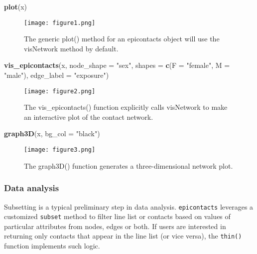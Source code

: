 \documentclass[9pt,a4paper,]{extarticle}
\newenvironment{Shaded}{\begin{snugshade}}{\end{snugshade}}
\newcommand{\KeywordTok}[1]{\textcolor[rgb]{0.13,0.29,0.53}{\textbf{#1}}}
\newcommand{\DataTypeTok}[1]{\textcolor[rgb]{0.13,0.29,0.53}{#1}}
\newcommand{\StringTok}[1]{\textcolor[rgb]{0.31,0.60,0.02}{#1}}
\newcommand{\NormalTok}[1]{#1}
\theoremstyle{definition}
\theoremstyle{definition}
\theoremstyle{definition}
\theoremstyle{remark}
\begin{document}
\begin{Shaded}
\begin{Highlighting}[]
\KeywordTok{plot}\NormalTok{(x)}
\end{Highlighting}
\end{Shaded}

\begin{figure}
\centering
\texttt{[image: figure1.png]}
\caption{The generic plot() method for an epicontacts object will use the visNetwork method by default.}
\end{figure}

\begin{Shaded}
\begin{Highlighting}[]
\KeywordTok{vis_epicontacts}\NormalTok{(x,}
                \DataTypeTok{node_shape =} \StringTok{"sex"}\NormalTok{,}
                \DataTypeTok{shapes =} \KeywordTok{c}\NormalTok{(}\DataTypeTok{F =} \StringTok{"female"}\NormalTok{, }\DataTypeTok{M =} \StringTok{"male"}\NormalTok{),}
                \DataTypeTok{edge_label =} \StringTok{"exposure"}\NormalTok{)}
\end{Highlighting}
\end{Shaded}

\begin{figure}
\centering
\texttt{[image: figure2.png]}
\caption{The vis\_epicontacts() function explicitly calls visNetwork to make an interactive plot of the contact network.}
\end{figure}

\begin{Shaded}
\begin{Highlighting}[]
\KeywordTok{graph3D}\NormalTok{(x, }\DataTypeTok{bg_col =} \StringTok{"black"}\NormalTok{)}
\end{Highlighting}
\end{Shaded}

\begin{figure}
\centering
\texttt{[image: figure3.png]}
\caption{The graph3D() function generates a three-dimensional network plot.}
\end{figure}

\subsubsection{Data analysis}\label{data-analysis}

Subsetting is a typical preliminary step in data analysis. \texttt{epicontacts} leverages a customized \texttt{subset} method to filter line list or contacts based on values of particular attributes from nodes, edges or both. If users are interested in returning only contacts that appear in the line list (or vice versa), the \texttt{thin()} function implements such logic.
\end{document}
